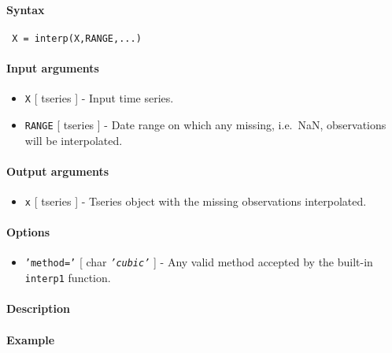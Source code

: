 


	\paragraph{Syntax}
 
 \begin{verbatim}
 X = interp(X,RANGE,...)
 \end{verbatim}
 
 \paragraph{Input arguments}
 
 \begin{itemize}
 \item
   \texttt{X} {[} tseries {]} - Input time series.
 \item
   \texttt{RANGE} {[} tseries {]} - Date range on which any missing,
   i.e.~NaN, observations will be interpolated.
 \end{itemize}
 
 \paragraph{Output arguments}
 
 \begin{itemize}
 \item
   \texttt{x} {[} tseries {]} - Tseries object with the missing
   observations interpolated.
 \end{itemize}
 
 \paragraph{Options}
 
 \begin{itemize}
 \item
   \texttt{'method='} {[} char \textbar{} \emph{\texttt{'cubic'}} {]} -
   Any valid method accepted by the built-in \texttt{interp1} function.
 \end{itemize}
 
 \paragraph{Description}
 
 \paragraph{Example}


